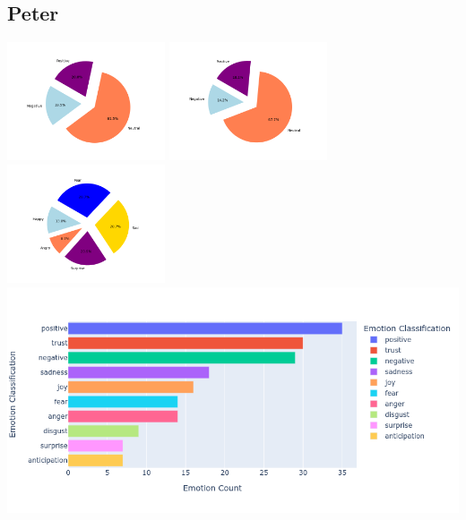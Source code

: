 \documentclass[a4paper,12pt]{article}
\begin{document}
	\subsection{Peter}
	{\includegraphics[height=3.5cm]{petersVaderEmotionalPie.png}}
	{\includegraphics[height=3.5cm]{petersBlobEmotionalPie.png}}
	{\includegraphics[height=3.5cm]{petersEmotionalPie.png}}\\
	{\includegraphics[width=17cm]{peterNrcImage.png}}\\
\end{document}
